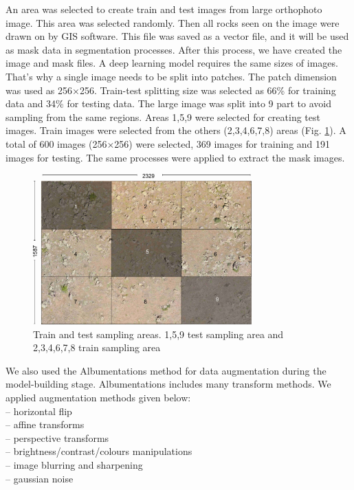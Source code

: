 \documentclass[a4paper,fleqn]{cas-sc}
\begin{document}
An area was selected to create train and test images from large orthophoto image. This area was selected randomly. Then all rocks seen on the image were drawn on by GIS software. This file was saved as a vector file, and it will be used as mask data in segmentation processes. After this process, we have created the image and mask files. 
A deep learning model requires the same sizes of images. That's why a single image needs to be split into patches. The patch dimension was used as 256×256. Train-test splitting size was selected as 66\% for training data and 34\% for testing data. The large image was split into 9 part to avoid sampling from the same regions. Areas 1,5,9 were selected for creating test images. Train images were selected from the others (2,3,4,6,7,8) areas (Fig. \ref{fig:Figure4}). A total of 600 images (256×256) were selected, 369 images for training and 191 images for testing. The same processes were applied to extract the mask images.
\begin{figure}
	\centering
	\includegraphics[width=0.75\textwidth]{figures/fig4.jpg}
	\caption{ Train and test sampling areas. 1,5,9 test sampling area and 2,3,4,6,7,8 train sampling area}
	\label{fig:Figure4}
\end{figure}

We also used the Albumentations \citep{buslaev2020albumentations} method for data augmentation during the model-building stage. Albumentations includes many transform methods. We applied augmentation methods given below:\\
– horizontal flip\\
– affine transforms\\
– perspective transforms\\
– brightness/contrast/colours manipulations\\
– image blurring and sharpening\\
– gaussian noise\\
\end{document}
